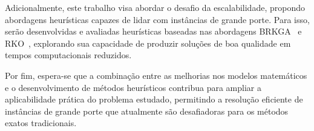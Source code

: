 Adicionalmente, este trabalho visa abordar o desafio da escalabilidade, propondo abordagens heurísticas capazes de lidar com instâncias de grande porte. Para isso, serão desenvolvidas e avaliadas heurísticas baseadas nas abordagens BRKGA~\cite{Resende2013} e RKO~\cite{Chaves2023}, explorando sua capacidade de produzir soluções de boa qualidade em tempos computacionais reduzidos.

Por fim, espera-se que a combinação entre as melhorias nos modelos matemáticos e o desenvolvimento de métodos heurísticos contribua para ampliar a aplicabilidade prática do problema estudado, permitindo a resolução eficiente de instâncias de grande porte que atualmente são desafiadoras para os métodos exatos tradicionais.